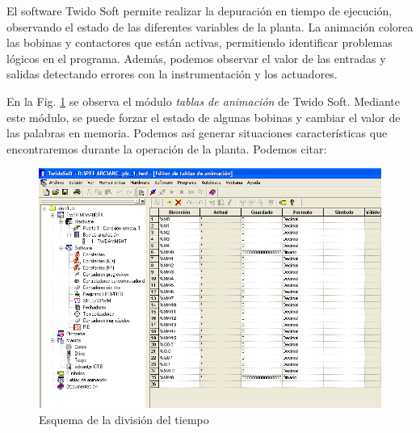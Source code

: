 El software Twido Soft permite realizar la depuración
en tiempo de ejecución, observando el estado de las diferentes variables
de la planta.
La animación colorea las bobinas y contactores que están activas, permitiendo
identificar problemas lógicos en el programa.
Además, podemos observar el valor de las entradas y salidas detectando
errores con la instrumentación y los actuadores.

En la Fig. \ref{img:twidosoftdebug} se observa el módulo \emph{tablas
de animación} de Twido Soft.
Mediante este módulo, se puede forzar el estado de algunas bobinas y cambiar el
valor de las palabras en memoria.
Podemos así generar situaciones características que encontraremos durante la
operación de la planta.
Podemos citar:

\begin{figure}[ht]
	\centering
	\includegraphics[width=.8\textwidth]
	{Cap4-ProgramacionPLC/images/twidosoftdebug.png}
	\caption{Esquema de la división del tiempo}
	\label{img:twidosoftdebug}
\end{figure}


